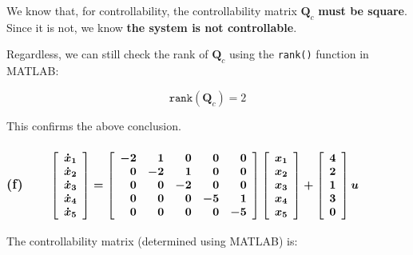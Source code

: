 \documentclass[12pt, letterpaper]{../assignment}
\begin{document}
\begin{answer}
We know that, for controllability,
the controllability matrix $\textbf{Q}_c$ \textbf{must be square}.
Since it is not, we know \textbf{the system is not controllable}.
\end{answer}

Regardless, we can still check the rank of $\textbf{Q}_c$ using the \texttt{rank()} function in MATLAB:

$$ \texttt{rank}(\textbf{Q}_c ) = 2 $$

This confirms the above conclusion.

\subsubsection*{(f) \ \ \ $\boldmath{
\left[\begin{array}{c} \dot{x}_1\\\dot{x}_2\\\dot{x}_3\\\dot{x}_4\\\dot{x}_5 \end{array}\right]
= \left[\begin{array}{rrrrr}
            -2 & 1 & 0 & 0 & 0\\
             0 & -2  & 1 & 0 & 0\\
             0 & 0  & -2 & 0 & 0\\
             0 & 0  & 0 & -5 & 1\\
             0 & 0 & 0 & 0 & -5
        \end{array}\right]
\left[\begin{array}{c} x_1\\x_2\\x_3\\x_4\\x_5  \end{array}\right]
+ \left[\begin{array}{r} 4  \\ 2 \\ 1 \\ 3 \\ 0 \end{array}\right] u}$}


The controllability matrix (determined using MATLAB) is:
\end{document}
